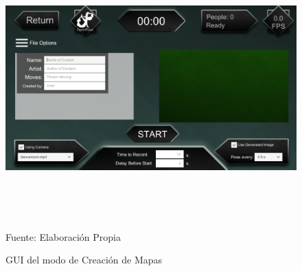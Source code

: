 \begin{figure}[h]
	\centering
	\includegraphics[width=16cm,height=10cm]{./Images/modocreador.png}
	\caption{GUI del modo de Creación de Mapas}
	\footnotesize Fuente: Elaboración Propia
	\label{gui3}
\end{figure}






